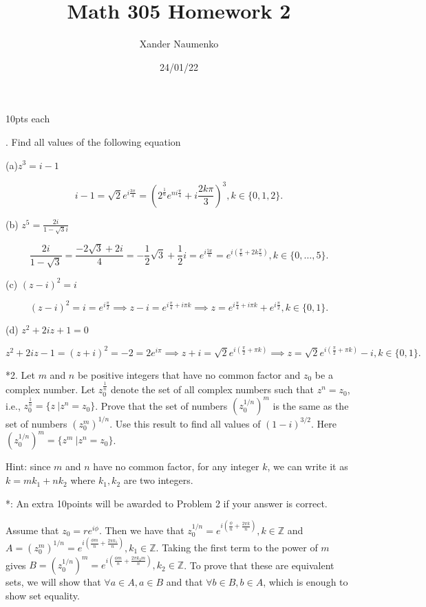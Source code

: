\documentclass[letterpaper, reqno,11pt]{article}
\begin{document}
\title{Math 305 Homework 2}
\date{24/01/22}
\author{Xander Naumenko}
\maketitle

\vskip 0.5cm

10pts each

. Find all values of the following equation

(a)$ z^3= i-1$

\[
i-1=\sqrt{2}e^{i\frac{3\pi}{4}}=(2^{\frac{1}{6}}e^{ni\frac{\pi}{4}}+i\frac{2k\pi}{3})^3, k\in \{0,1,2\} 
.\]

(b) $ z^5= \frac{ 2i}{ 1-\sqrt{3} i}$

\[
\frac{2i}{1-\sqrt{3} }=\frac{-2\sqrt{3} +2i}{4}=-\frac{1}{2}\sqrt{3} +\frac{1}{2}i=e^{i\frac{5\pi}{6}}=e^{i\left( \frac{\pi}{6}+2k\frac{\pi}{5} \right) }, k\in \{0, \ldots, 5\} 
.\]

(c) $ (z-i)^2= i$

\[
    (z-i)^2=i=e^{i\frac{\pi}{2}}\implies z-i = e^{i\frac{\pi}{4}+i \pi k}\implies z=e^{i\frac{\pi}{4}+i \pi k}+e^{i\frac{\pi}{2}}, k\in \{0, 1\} 
.\]

(d) $z^2 +2i z+1=0 $

\[
z^2+2iz-1=(z+i)^2=-2=2e^{i\pi}\implies z+i=\sqrt{2} e^{i\left( \frac{\pi}{2}+\pi k \right) }\implies z=\sqrt{2} e^{i\left( \frac{\pi}{2}+\pi k \right) }-i, k\in \{0, 1\} 
.\]


\medskip

\noindent
*2. Let $m$ and $n$ be positive integers that have no common factor and $z_0$ be a complex number. Let $ z_0^{\frac{1}{n}}$ denote the set of all complex numbers such that $ z^n=z_0$, i.e., $ z_0^{\frac{1}{n}}=\{ z \ | z^n=z_0\}$. Prove that the set of numbers $(z_0^{1/n})^m$ is the same as the set of numbers $ (z_0^m)^{1/n}$.  Use this result to find all values of $ (1-i)^{3/2}$. Here $ (z_0^{1/n})^m=\{ z^m \ | z^n= z_0 \}$.

\medskip

Hint: since $ m$ and $n$ have no common factor, for any integer $k$, we can write it as $ k= m k_1+ n k_2$ where $k_1, k_2$ are two integers.


*: An extra 10points will be awarded to Problem 2 if your answer is correct. 

\medskip

Assume that $z_0=re^{i\phi}$. Then we have that $z_0^{1 /n}=e^{i\left( \frac{\phi}{n}+\frac{2\pi k}{n} \right) }, k\in\mathbb{Z}$ and $A=\left( z_0^m \right)^{1 /n}=e^{i\left( \frac{\phi m}{n}+\frac{2\pi k_1}{n} \right) }, k_1\in\mathbb{Z}$. Taking the first term to the power of $m$ gives $B=\left( z_0^{1 /n}\right)^{m}=e^{i\left( \frac{\phi m}{n}+\frac{2\pi k_2 m}{n} \right) }, k_2\in\mathbb{Z}$. To prove that these are equivalent sets, we will show that $\forall a\in A, a\in B$ and that $\forall b\in B, b\in A$, which is enough to show set equality. 
\end{document}
